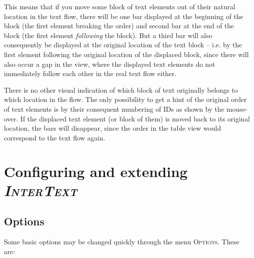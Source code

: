 \documentclass[a4paper,10pt,oneside]{book}
\newcommand{\IT}{\textit{\textsc{InterText}}\xspace}
\newcommand{\menu}[1]{\textsc{#1}}
\begin{document}
This means that if you move some block of text elements out of their natural location in the text flow, there will be one bar displayed at the beginning of the block (the first element breaking the order) and second bar at the end of the block (the first element \emph{following} the block). But a third bar will also consequently be displayed at the original location of the text block -- i.e. by the first element following the original location of the displaced block, since there will also occur a gap in the view, where the displayed text elements do not immediately follow each other in the real text flow either.

There is no other visual indication of which block of text originally belongs to which location in the flow. The only possibility to get a hint of the original order of text elements is by their consequent numbering of IDs as shown by the mouse-over. If the displaced text element (or block of them) is moved back to its original location, the bars will disappear, since the order in the table view would correspond to the text flow again.

\chapter{Configuring and extending \IT}\label{ch:detail:config}

\section{Options}\label{ch:detail:config:options}

Some basic options may be changed quickly through the menu \menu{Options}. These are:
\end{document}
